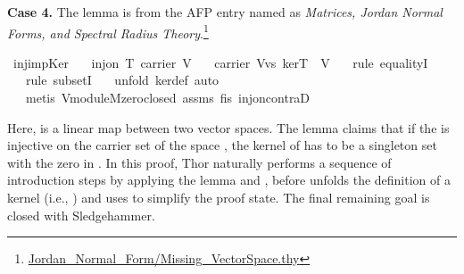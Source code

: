\documentclass{article}
\begin{document}
{\bf Case 4.} The lemma  is from the AFP entry named as \emph{Matrices, Jordan Normal Forms, and Spectral Radius Theory}.\footnote{\url{Jordan_Normal_Form/Missing_VectorSpace.thy}}
\begin{mdframed}
\begin{isabelle}
\isamarkupfalse \ inj{\isacharunderscore}{\kern0pt}imp{\isacharunderscore}{\kern0pt}Ker{}{\isacharcolon}{\kern0pt}\isanewline
\ \ \ {\isachardoublequoteopen}inj{\isacharunderscore}{\kern0pt}on\ T\ {\isacharparenleft}{\kern0pt}carrier\ V{\isacharparenright}{\kern0pt}{\isachardoublequoteclose}\isanewline
\ \ \ {\isachardoublequoteopen}carrier\ {\isacharparenleft}{\kern0pt}V{\isachardot}{\kern0pt}vs\ kerT{\isacharparenright}{\kern0pt}\ {\isacharequal}{\kern0pt}\ {\isacharbraceleft}{\kern0pt}{\isasymzero}\isactrlbsub V\isactrlesub {\isacharbraceright}{\kern0pt}{\isachardoublequoteclose}\isanewline
\ \ \isamarkupfalse \ {\isacharparenleft}{\kern0pt}rule\ equalityI{\isacharparenright}{\kern0pt}\isanewline
\ \ \isamarkupfalse \ {\isacharparenleft}{\kern0pt}rule\ subsetI{\isacharparenright}{\kern0pt}\isanewline
\ \ \isamarkupfalse \ {\isacharparenleft}{\kern0pt}unfold\ ker{\isacharunderscore}{\kern0pt}def{\isacharcomma}{\kern0pt}\ auto{\isacharparenright}{\kern0pt}\isanewline
\ \ \isamarkupfalse \ {\isacharparenleft}{\kern0pt}metis\ V{\isachardot}{\kern0pt}module{\isachardot}{\kern0pt}M{\isachardot}{\kern0pt}zero{\isacharunderscore}{\kern0pt}closed\ assms\ f{}{\isacharunderscore}{\kern0pt}is{\isacharunderscore}{\kern0pt}{}\ inj{\isacharunderscore}{\kern0pt}on{\isacharunderscore}{\kern0pt}contraD{\isacharparenright}{\kern0pt}\end{isabelle}
\end{mdframed}
Here,  is a linear map between two vector spaces. The lemma claims that if the  is injective on the carrier set of the space , the kernel of  has to be a singleton set with the zero in . In this proof, Thor naturally performs a sequence of introduction steps by applying the lemma  and , before unfolds the definition of a kernel (i.e., ) and uses  to simplify the proof state. The final remaining goal is closed with Sledgehammer. 
\end{document}
